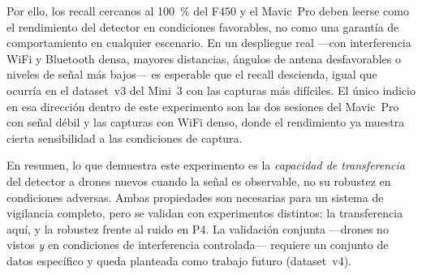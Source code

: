Por ello, los recall cercanos al \SI{100}{\percent} del F450 y el Mavic~Pro deben leerse como el rendimiento del detector en condiciones favorables, no como una garantía de comportamiento en cualquier escenario. En un despliegue real ---con interferencia WiFi y Bluetooth densa, mayores distancias, ángulos de antena desfavorables o niveles de señal más bajos--- es esperable que el recall descienda, igual que ocurría en el dataset~v3 del Mini~3 con las capturas más difíciles. El único indicio en esa dirección dentro de este experimento son las dos sesiones del Mavic~Pro con señal débil y las capturas con WiFi denso, donde el rendimiento ya muestra cierta sensibilidad a las condiciones de captura.

En resumen, lo que demuestra este experimento es la \emph{capacidad de transferencia} del detector a drones nuevos cuando la señal es observable, no su robustez en condiciones adversas. Ambas propiedades son necesarias para un sistema de vigilancia completo, pero se validan con experimentos distintos: la transferencia aquí, y la robustez frente al ruido en P4. La validación conjunta ---drones no vistos \emph{y} en condiciones de interferencia controlada--- requiere un conjunto de datos específico y queda planteada como trabajo futuro (dataset~v4).
